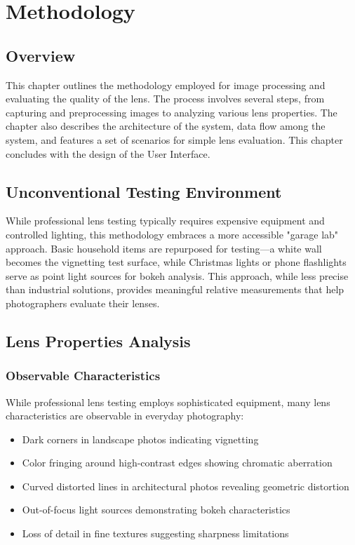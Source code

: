 \chapter{Methodology}

\section{Overview}
This chapter outlines the methodology employed for image processing and evaluating the quality of the lens. The process involves several steps, from capturing and preprocessing images to analyzing various lens properties. The chapter also describes the architecture of the system, data flow among the system, and features a set of scenarios for simple lens evaluation. This chapter concludes with the design of the User Interface.

\section{Unconventional Testing Environment}
While professional lens testing typically requires expensive equipment and controlled lighting, this methodology embraces a more accessible "garage lab" approach. Basic household items are repurposed for testing---a white wall becomes the vignetting test surface, while Christmas lights or phone flashlights serve as point light sources for bokeh analysis. This approach, while less precise than industrial solutions, provides meaningful relative measurements that help photographers evaluate their lenses.

\section{Lens Properties Analysis}

\subsection{Observable Characteristics}
While professional lens testing employs sophisticated equipment, many lens characteristics are observable in everyday photography:

\begin{itemize}
    \item Dark corners in landscape photos indicating vignetting
    \item Color fringing around high-contrast edges showing chromatic aberration
    \item Curved distorted lines in architectural photos revealing geometric distortion
    \item Out-of-focus light sources demonstrating bokeh characteristics
    \item Loss of detail in fine textures suggesting sharpness limitations
\end{itemize}

